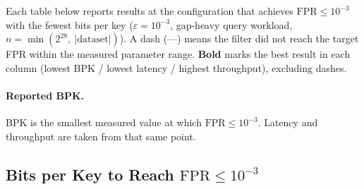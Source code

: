 Each table below reports results at the configuration that achieves
$\mathrm{FPR} \leq 10^{-3}$ with the fewest bits per key
($\varepsilon = 10^{-3}$, gap-heavy query workload,
$n = \min(2^{28},\allowbreak\ |\text{dataset}|)$).
A dash (\textnormal{---}) means the filter did not reach the target FPR
within the measured parameter range.
\textbf{Bold} marks the best result in each column
(lowest BPK / lowest latency / highest throughput), excluding dashes.

\paragraph{Reported BPK.}
BPK is the smallest measured value at which $\mathrm{FPR} \leq 10^{-3}$.
Latency and throughput are taken from that same point.


\subsection{Bits per Key to Reach \texorpdfstring{$\mathrm{FPR} \leq 10^{-3}$}{FPR <= 0.001}}
\label{subsec:eval-bpk}

